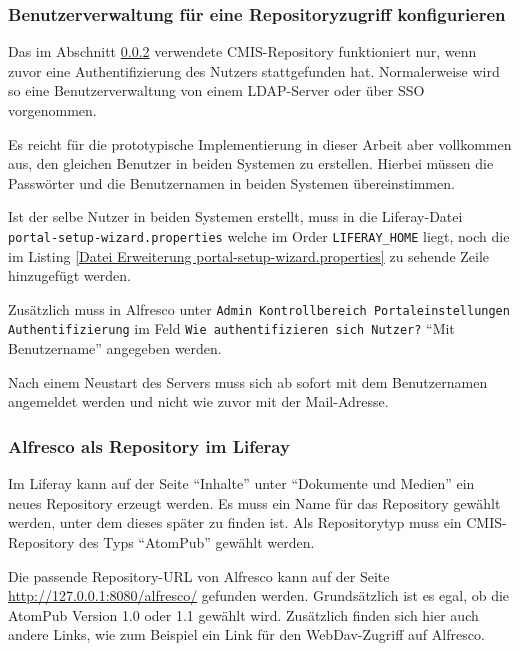 \subsubsection{Benutzerverwaltung f\"ur eine Repositoryzugriff konfigurieren}\label{Benutzerverwaltung f\"ur eine Repositoryzugriff konfigurieren}
Das im Abschnitt \ref{Alfresco als Repository im Liferay} verwendete CMIS-Repository funktioniert nur, wenn zuvor eine Authentifizierung des Nutzers stattgefunden hat. Normalerweise wird so eine Benutzerverwaltung von einem LDAP-Server oder \"uber SSO vorgenommen. 

Es reicht f\"ur die prototypische Implementierung in dieser Arbeit aber vollkommen aus, den gleichen Benutzer in beiden Systemen zu erstellen. Hierbei m\"ussen die Passw\"orter und die Benutzernamen in beiden Systemen \"ubereinstimmen.

Ist der selbe Nutzer in beiden Systemen erstellt, muss in die Liferay-Datei \texttt{portal-setup-wizard.properties} welche im Order \texttt{LIFERAY\_HOME} liegt, noch die im Listing \ref{Datei Erweiterung portal-setup-wizard.properties} zu sehende Zeile hinzugef\"ugt werden. \cite{CMIS_Repo}



Zus\"atzlich muss in Alfresco unter \texttt{Admin \MVRightarrow Kontrollbereich \MVRightarrow Portaleinstellungen \MVRightarrow} \\
\texttt{Authentifizierung} im Feld \texttt{Wie authentifizieren sich Nutzer?} "`Mit Benutzername"' angegeben werden.

Nach einem Neustart des Servers muss sich ab sofort mit dem Benutzernamen angemeldet werden und nicht wie zuvor mit der Mail-Adresse. \cite{CMIS_Config}

\subsubsection{Alfresco als Repository im Liferay}\label{Alfresco als Repository im Liferay}
Im Liferay kann auf der Seite "`Inhalte"' unter "`Dokumente und Medien"' ein neues Repository erzeugt werden. Es muss ein Name f\"ur das Repository gew\"ahlt werden, unter dem dieses sp\"ater zu finden ist. Als Repositorytyp muss ein \ac{CMIS}-Repository des Typs "`AtomPub"' gew\"ahlt werden. 

Die passende Repository-URL von Alfresco kann auf der Seite \url{http://127.0.0.1:8080/alfresco/} gefunden werden. Grunds\"atzlich ist es egal, ob die AtomPub Version 1.0 oder 1.1 gew\"ahlt wird. Zus\"atzlich finden sich hier auch andere Links, wie zum Beispiel ein Link f\"ur den WebDav-Zugriff auf Alfresco.

